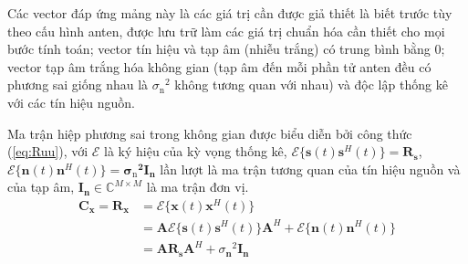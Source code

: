 Các vector đáp ứng mảng này là các giá trị cần được giả thiết là biết trước tùy theo cấu hình anten, được lưu trữ làm các giá trị chuẩn hóa cần thiết cho mọi bước tính toán; vector tín hiệu và tạp âm (nhiễu trắng) có trung bình bằng 0; vector tạp âm trắng hóa không gian (tạp âm đến mỗi phần tử anten đều có phương sai giống nhau là ${\sigma_{\mathrm{n}}}^{2}$ không tương quan với nhau) và độc lập thống kê với các tín hiệu nguồn.

Ma trận hiệp phương sai trong không gian được biểu diễn bởi công thức (\ref{eq:Ruu}), với $\mathcal{E}$ là ký hiệu của kỳ vọng thống kê, $\mathcal{E}\{\mathbf{s}(t)\mathbf{s}^{H}(t)\} = \mathbf{R}_{\textbf{s}}$, $\mathcal{E}\{\mathbf{n}(t)\mathbf{n}^{H}(t)\} = \mathbf{{{\sigma}_{\mathrm{n}}}^{2}I_{\mathbf{n}}}$ lần lượt là ma trận tương quan của tín hiệu nguồn và của tạp âm, $\mathbf{{I_{n}}} \in \mathbb{C}^{M \times M}$ là ma trận đơn vị. 
\begin{equation}
\begin{split}
	\mathbf{C}_{\mathbf{x}} = \mathbf{R}_{\mathbf{x}} &= 	\mathcal{E}\{\mathbf{x}(t)\mathbf{x}^{H}(t)\}	\\
	&= \mathbf{A}\mathcal{E}\{\mathbf{s}(t)\mathbf{s}^{H}(t)\}\mathbf{A}^{H} + \mathcal{E}\{\mathbf{n}(t)\mathbf{n}^{H}(t)\}	\\
	&= \mathbf{A}\mathbf{R}_{\mathbf{s}}\mathbf{A}^{H} + {\sigma_{\mathbf{n}}}^{2}\mathbf{I}_{\mathbf{n}}
\end{split}
\label{eq:Ruu}
\end{equation}

